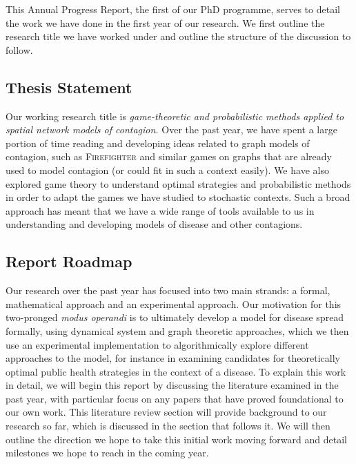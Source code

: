\documentclass[../report.tex]{subfiles}
\begin{document}
This Annual Progress Report, the first of our PhD programme, serves to detail the work we have done in the first year of our research. We first outline the research title we have worked under and outline the structure of the discussion to follow.

\subsection{Thesis Statement}

Our working research title is {\it game-theoretic and probabilistic methods applied to spatial network models of contagion.} Over the past year, we have spent a large portion of time reading and developing ideas related to graph models of contagion, such as {\scshape Firefighter} and similar games on graphs that are already used to model contagion (or could fit in such a context easily). We have also explored game theory to understand optimal strategies and probabilistic methods in order to adapt the games we have studied to stochastic contexts. Such a broad approach has meant that we have a wide range of tools available to us in understanding and developing models of disease and other contagions.

\subsection{Report Roadmap}

Our research over the past year has focused into two main strands: a formal, mathematical approach and an experimental approach. Our motivation for this two-pronged {\it modus operandi} is to ultimately develop a model for disease spread formally, using dynamical system and graph theoretic approaches, which we then use an experimental implementation to algorithmically explore different approaches to the model, for instance in examining candidates for theoretically optimal public health strategies in the context of a disease. To explain this work in detail, we will begin this report by discussing the literature examined in the past year, with particular focus on any papers that have proved foundational to our own work. This literature review section will provide background to our research so far, which is discussed in the section that follows it. We will then outline the direction we hope to take this initial work moving forward and detail milestones we hope to reach in the coming year.
\end{document}
